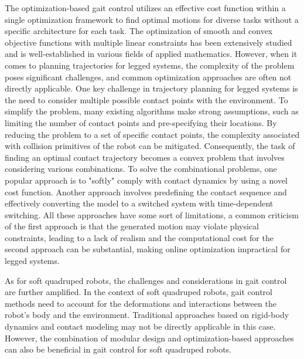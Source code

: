 The optimization-based gait control utilizes an effective cost function within a single optimization framework to find optimal motions for diverse tasks without a specific architecture for each task. The optimization of smooth and convex objective functions with multiple linear constraints has been extensively studied and is well-established in various fields of applied mathematics\cite{koldaOptimizationDirectSearch2003}. However, when it comes to planning trajectories for legged systems, the complexity of the problem poses significant challenges, and common optimization approaches are often not directly applicable. One key challenge in trajectory planning for legged systems is the need to consider multiple possible contact points with the environment. To simplify the problem, many existing algorithms make strong assumptions, such as limiting the number of contact points\cite{daiWholebodyMotionPlanning2014} and pre-specifying their locations\cite{gehringPracticeMakesPerfect2016}. By reducing the problem to a set of specific contact points, the complexity associated with collision primitives of the robot can be mitigated. Consequently, the task of finding an optimal contact trajectory becomes a convex problem that involves considering various combinations. To solve the combinational problems, one popular approach is to "softly" comply with contact dynamics by using a novel cost function\cite{farshidianRealtimeMotionPlanning2017}. Another approach involves predefining the contact sequence and effectively converting the model to a switched system with time-dependent switching\cite{kochOptimizationbasedWalkingGeneration2012}. All these approaches have some sort of limitations, a common criticism of the first approach is that the generated motion may violate physical constraints, leading to a lack of realism and the computational cost for the second approach can be substantial, making online optimization impractical for legged systems. 

As for soft quadruped robots, the challenges and considerations in gait control are further amplified. In the context of soft quadruped robots, gait control methods need to account for the deformations and interactions between the robot's body and the environment. Traditional approaches based on rigid-body dynamics and contact modeling may not be directly applicable in this case. However, the combination of modular design and optimization-based approaches can also be beneficial in gait control for soft quadruped robots. 

